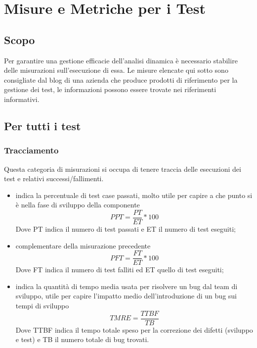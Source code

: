 \documentclass[PianoDiProgetto.tex]{subfiles}
\begin{document}
\chapter{Misure e Metriche per i Test}
\section{Scopo}
Per garantire una gestione efficacie dell'analisi dinamica è necessario stabilire delle misurazioni sull'esecuzione di essa.
Le misure elencate qui sotto sono consigliate dal blog di una azienda che produce prodotti di riferimento per la gestione dei test, le informazioni possono essere trovate nei riferimenti informativi.

\section{Per tutti i test}
\subsection{Tracciamento}
Questa categoria di misurazioni si occupa di tenere traccia delle esecuzioni dei test e relativi successi/fallimenti.
\begin{itemize}
	\item {} indica la percentuale di test case passati, molto utile per capire a che punto si è nella fase di sviluppo della componente
	\[PPT=\dfrac{PT}{ET}*100\]
	Dove PT indica il numero di test passati e ET il numero di test eseguiti;
	\item {} complementare della misurazione precedente
	\[PFT=\dfrac{FT}{ET}*100\]
	Dove FT indica il numero di test falliti ed ET quello di test eseguiti;
	\item {} indica la quantità di tempo media usata per risolvere un bug dal team di sviluppo, utile per capire l'impatto medio dell'introduzione di un bug sui tempi di sviluppo
	\[TMRE=\dfrac{TTBF}{TB}\]
	Dove TTBF indica il tempo totale speso per la correzione dei difetti (sviluppo e test) e TB il numero totale di bug trovati.
\end{itemize}
\end{document}
